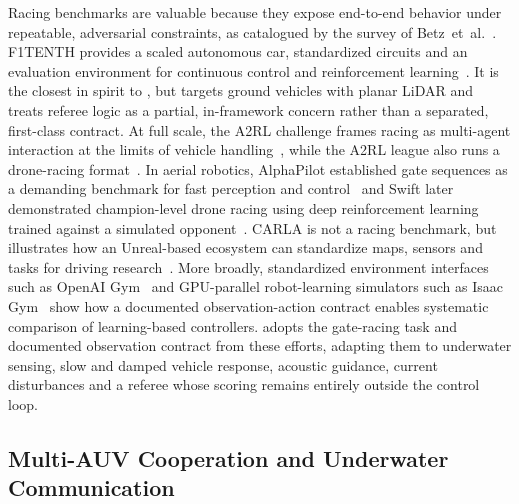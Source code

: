 Racing benchmarks are valuable because they expose end-to-end behavior under repeatable, adversarial constraints, as catalogued by the survey of Betz~et~al.~\cite{betz2022autonomous}. F1TENTH provides a scaled autonomous car, standardized circuits and an evaluation environment for continuous control and reinforcement learning~\cite{okelly2020f1tenth}. It is the closest in spirit to \mra{}, but targets ground vehicles with planar LiDAR and treats referee logic as a partial, in-framework concern rather than a separated, first-class contract. At full scale, the A2RL challenge frames racing as multi-agent interaction at the limits of vehicle handling~\cite{hoffmann2026a2rl}, while the A2RL league also runs a drone-racing format~\cite{a2rl2024league}. In aerial robotics, AlphaPilot established gate sequences as a demanding benchmark for fast perception and control~\cite{foehn2020alphapilot} and Swift later demonstrated champion-level drone racing using deep reinforcement learning trained against a simulated opponent~\cite{kaufmann2023swift}. CARLA is not a racing benchmark, but illustrates how an Unreal-based ecosystem can standardize maps, sensors and tasks for driving research~\cite{dosovitskiy2017carla}. More broadly, standardized environment interfaces such as OpenAI Gym~\cite{brockman2016openaigym} and GPU-parallel robot-learning simulators such as Isaac Gym~\cite{makoviychuk2021isaacgym} show how a documented observation-action contract enables systematic comparison of learning-based controllers. \mra{} adopts the gate-racing task and documented observation contract from these efforts, adapting them to underwater sensing, slow and damped vehicle response, acoustic guidance, current disturbances and a referee whose scoring remains entirely outside the control loop.

\subsection{Multi-AUV Cooperation and Underwater Communication}

